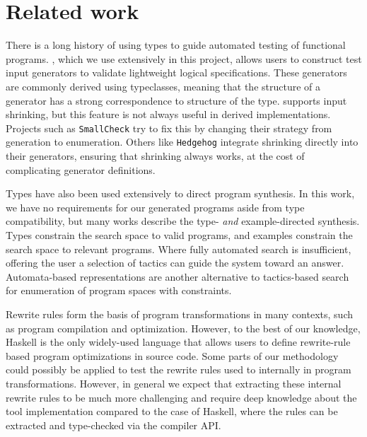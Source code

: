 \section{Related work}
\label{sec:related}

There is a long history of using types to guide automated testing of functional programs. \Quickcheck \cite{claessen2000quickcheck}, which we use extensively in this project, allows users to construct test input generators to validate lightweight logical specifications. These generators are commonly derived using typeclasses, meaning that the structure of a generator has a strong correspondence to structure of the type. \Quickcheck supports input shrinking, but this feature is not always useful in derived implementations. Projects such as \texttt{SmallCheck} \cite{runciman2008smallcheck} try to fix this by changing their strategy from generation to enumeration. Others like \texttt{Hedgehog} \cite{hedgehog} integrate shrinking directly into their generators, ensuring that shrinking always works, at the cost of complicating generator definitions.

Types have also been used extensively to direct program synthesis. In this work, we have no requirements for our generated programs aside from type compatibility, but many works describe the type- \textit{and} example-directed synthesis. \cite{osera2015type, feser2015synthesizing} Types constrain the search space to valid programs, and examples constrain the search space to relevant programs. Where fully automated search is insufficient, offering the user a selection of tactics can guide the system toward an answer. \cite{delahaye2000tactic} Automata-based representations \cite{koppel2022searching} are another alternative to tactics-based search for enumeration of program spaces with constraints.

Rewrite rules form the basis of program transformations in many contexts, such
as program compilation and optimization\cite{visser2005survey}. However, to the
best of our knowledge, Haskell is the only widely-used language that allows
users to define rewrite-rule based program optimizations in source code. Some
parts of our methodology could possibly be applied to test the rewrite rules
used to internally in program transformations. However, in general we expect
that extracting these internal rewrite rules to be much more challenging and
require deep knowledge about the tool implementation compared to the case of
Haskell, where the rules can be extracted and type-checked via the compiler API.

